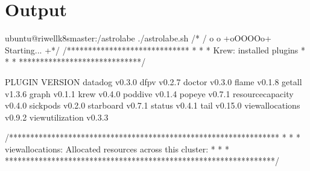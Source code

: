 \documentclass[letterpaper,10pt,english]{sphinxmanual}
\begin{document}
\section{Output}
\label{\detokenize{sample_output:output}}
\begin{sphinxVerbatim}[commandchars=\\\{\}]
ubuntu@riwell\PYGZhy{}k8s\PYGZhy{}master:\PYGZti{}/astrolabe\PYGZdl{} ./astrolabe.sh
/*       \PYGZus{}/\PYGZus{}
         o o
 +\PYGZhy{}\PYGZhy{}\PYGZhy{}\PYGZhy{}oOO\PYGZhy{}\PYGZus{}\PYGZhy{}OOo\PYGZhy{}+
                 
   Starting...   
                 
 +\PYGZhy{}\PYGZhy{}\PYGZhy{}\PYGZhy{}\PYGZhy{}\PYGZhy{}\PYGZhy{}\PYGZhy{}\PYGZhy{}\PYGZhy{}\PYGZhy{}\PYGZhy{}\PYGZhy{}\PYGZhy{}\PYGZhy{}*/
/*****************************
 *                           *
 *  Krew: installed plugins  *
 *                           *
 *****************************/

PLUGIN             VERSION
datadog            v0.3.0
df\PYGZhy{}pv              v0.2.7
doctor             v0.3.0
flame              v0.1.8
get\PYGZhy{}all            v1.3.6
graph              v0.1.1
krew               v0.4.0
pod\PYGZhy{}dive           v0.1.4
popeye             v0.7.1
resource\PYGZhy{}capacity  v0.4.0
sick\PYGZhy{}pods          v0.2.0
starboard          v0.7.1
status             v0.4.1
tail               v0.15.0
view\PYGZhy{}allocations   v0.9.2
view\PYGZhy{}utilization   v0.3.3

/****************************************************************
 *                                                              *
 *  view\PYGZhy{}allocations: Allocated resources across this cluster:  *
 *                                                              *
 ****************************************************************/


\end{sphinxVerbatim}
\end{document}
